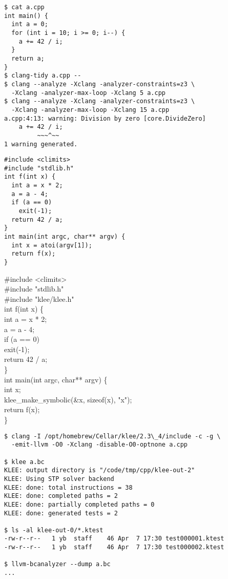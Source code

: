 \documentclass{article}
\begin{document}
{\scriptsize\begin{verbatim}
$ cat a.cpp
int main() {
  int a = 0;
  for (int i = 10; i >= 0; i--) {
    a += 42 / i;
  }
  return a;
}
$ clang-tidy a.cpp --
$ clang --analyze -Xclang -analyzer-constraints=z3 \
  -Xclang -analyzer-max-loop -Xclang 5 a.cpp
$ clang --analyze -Xclang -analyzer-constraints=z3 \
  -Xclang -analyzer-max-loop -Xclang 15 a.cpp
a.cpp:4:13: warning: Division by zero [core.DivideZero]
    a += 42 / i;
         ~~~^~~
1 warning generated.
\end{verbatim}
}

\plush{}



\begin{pptWide}{2}
{\scriptsize\begin{verbatim}
#include <climits>
#include "stdlib.h"
int f(int x) {
  int a = x * 2;
  a = a - 4;
  if (a == 0)
    exit(-1);
  return 42 / a;
}
int main(int argc, char** argv) {
  int x = atoi(argv[1]);
  return f(x);
}
\end{verbatim}
}
\par\columnbreak\par
{\ttfamily\scriptsize
\#include <climits> \\
\#include "stdlib.h" \\
{\color{orange}\#include "klee/klee.h"} \\
int f(int x) \{ \\
\quad  int a = x * 2; \\
\quad  a = a - 4; \\
\quad  if (a == 0) \\
\quad\quad    exit(-1); \\
\quad  return 42 / a; \\
\} \\
int main(int argc, char** argv) \{ \\
{\color{orange}
\quad  int x; \\
\quad  klee\_make\_symbolic(\&x, sizeof(x), "x");} \\
\quad  return f(x); \\
\}}
\end{pptWide}

\plush{}


{\scriptsize\begin{verbatim}
$ clang -I /opt/homebrew/Cellar/klee/2.3\_4/include -c -g \
  -emit-llvm -O0 -Xclang -disable-O0-optnone a.cpp

$ klee a.bc
KLEE: output directory is "/code/tmp/cpp/klee-out-2"
KLEE: Using STP solver backend
KLEE: done: total instructions = 38
KLEE: done: completed paths = 2
KLEE: done: partially completed paths = 0
KLEE: done: generated tests = 2

$ ls -al klee-out-0/*.ktest
-rw-r--r--   1 yb  staff    46 Apr  7 17:30 test000001.ktest
-rw-r--r--   1 yb  staff    46 Apr  7 17:30 test000002.ktest

$ llvm-bcanalyzer --dump a.bc
...
\end{verbatim}
}
\end{document}
